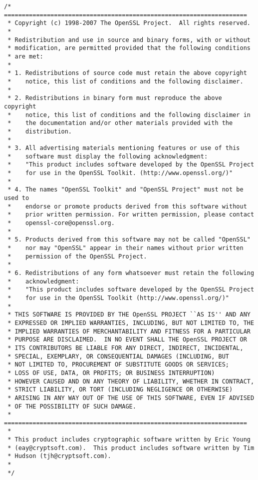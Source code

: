 \begin{lstlisting}
/* ====================================================================
 * Copyright (c) 1998-2007 The OpenSSL Project.  All rights reserved.
 *
 * Redistribution and use in source and binary forms, with or without
 * modification, are permitted provided that the following conditions
 * are met:
 *
 * 1. Redistributions of source code must retain the above copyright
 *    notice, this list of conditions and the following disclaimer.
 *
 * 2. Redistributions in binary form must reproduce the above copyright
 *    notice, this list of conditions and the following disclaimer in
 *    the documentation and/or other materials provided with the
 *    distribution.
 *
 * 3. All advertising materials mentioning features or use of this
 *    software must display the following acknowledgment:
 *    "This product includes software developed by the OpenSSL Project
 *    for use in the OpenSSL Toolkit. (http://www.openssl.org/)"
 *
 * 4. The names "OpenSSL Toolkit" and "OpenSSL Project" must not be used to
 *    endorse or promote products derived from this software without
 *    prior written permission. For written permission, please contact
 *    openssl-core@openssl.org.
 *
 * 5. Products derived from this software may not be called "OpenSSL"
 *    nor may "OpenSSL" appear in their names without prior written
 *    permission of the OpenSSL Project.
 *
 * 6. Redistributions of any form whatsoever must retain the following
 *    acknowledgment:
 *    "This product includes software developed by the OpenSSL Project
 *    for use in the OpenSSL Toolkit (http://www.openssl.org/)"
 *
 * THIS SOFTWARE IS PROVIDED BY THE OpenSSL PROJECT ``AS IS'' AND ANY
 * EXPRESSED OR IMPLIED WARRANTIES, INCLUDING, BUT NOT LIMITED TO, THE
 * IMPLIED WARRANTIES OF MERCHANTABILITY AND FITNESS FOR A PARTICULAR
 * PURPOSE ARE DISCLAIMED.  IN NO EVENT SHALL THE OpenSSL PROJECT OR
 * ITS CONTRIBUTORS BE LIABLE FOR ANY DIRECT, INDIRECT, INCIDENTAL,
 * SPECIAL, EXEMPLARY, OR CONSEQUENTIAL DAMAGES (INCLUDING, BUT
 * NOT LIMITED TO, PROCUREMENT OF SUBSTITUTE GOODS OR SERVICES;
 * LOSS OF USE, DATA, OR PROFITS; OR BUSINESS INTERRUPTION)
 * HOWEVER CAUSED AND ON ANY THEORY OF LIABILITY, WHETHER IN CONTRACT,
 * STRICT LIABILITY, OR TORT (INCLUDING NEGLIGENCE OR OTHERWISE)
 * ARISING IN ANY WAY OUT OF THE USE OF THIS SOFTWARE, EVEN IF ADVISED
 * OF THE POSSIBILITY OF SUCH DAMAGE.
 * ====================================================================
 *
 * This product includes cryptographic software written by Eric Young
 * (eay@cryptsoft.com).  This product includes software written by Tim
 * Hudson (tjh@cryptsoft.com).
 *
 */


\end{lstlisting}
